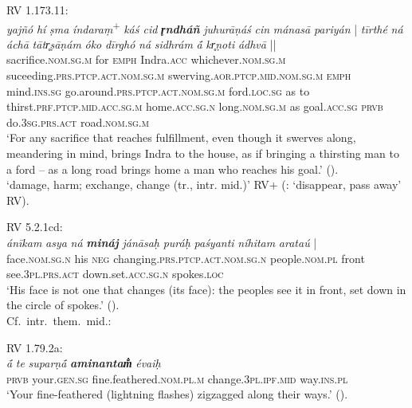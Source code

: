 \documentclass[output=paper,colorlinks,citecolor=brown]{langscibook}
\begin{document}
\begin{exe}
\begin{xlist}
 RV 1.173.11:\\ \gll \textit{yajñó} \textit{hí} \textit{ṣma} \textit{índaraṃ}\textsuperscript{+} \textit{káś cid} {\textbf{\textit{r̥ndháñ}} } \textit{juhurāṇáś} \textit{cin} \textit{mánasā} {\textit{pariyán} |} \textit{tīrthé} \textit{ná} \textit{áchā} \textit{tātr̥ṣāṇám} \textit{óko}  \textit{dīrghó} \textit{ná} \textit{sidhrám} \textit{ā́} \textit{kr̥ṇoti} {\textit{ádhvā} ||}\\
 sacrifice.\textsc{nom.sg.m} for \textsc{emph} Indra.\textsc{acc} whichever.\textsc{nom.sg.m} suceeding.\textsc{prs.ptcp.act.nom.sg.m} swerving.\textsc{aor.ptcp.mid.nom.sg.m} \textsc{emph} mind.\textsc{ins.sg} go.around.\textsc{prs.ptcp.act.nom.sg.m}  ford.\textsc{loc.sg} as to thirst.\textsc{prf.ptcp.mid.acc.sg.m} home.\textsc{acc.sg.n} long.\textsc{nom.sg.m} as goal.\textsc{acc.sg} \textsc{prvb} do.\textsc{3sg.prs.act} road.\textsc{nom.sg.m} \\
\glt   `For any sacrifice that reaches fulfillment, even though it swerves along, meandering in mind, brings Indra to the house, as if bringing a thirsting man to a ford -- as a long road brings home a man who reaches his goal.' (\citealt{JamisonBrereton2014}).\\

\ex  {} ‘damage, harm; exchange, change (tr., intr. mid.)’ RV+ (:  ‘disappear, pass away’ RV).\\
\smallskip

RV 5.2.1cd:\\ \gll \textit{ánīkam} \textit{asya} \textit{ná} {\textbf{\textit{mináj}} } \textit{jánāsaḥ}  \textit{puráḥ} \textit{paśyanti} \textit{níhitam} {\textit{arataú} |}\\
face.\textsc{nom.sg.n} his \textsc{neg} changing.\textsc{prs.ptcp.act.nom.sg.n} people.\textsc{nom.pl} front see.\textsc{3pl.prs.act} down.set.\textsc{acc.sg.n} spokes.\textsc{loc}\\
\glt `His face is not one that changes (its face): the peoples see it in front, set down in the circle of spokes.' (\citealt{JamisonBrereton2014}).\\

\smallskip
Cf.\ intr.\ them.\ mid.:\\\smallskip

RV 1.79.2a:\\ \gll 
\textit{{ā́}} \textit{te} \textit{suparṇ{ā́}} {\textbf{\textit{aminantam̐}} } \textit{évaiḥ}\\
\textsc{prvb} your.\textsc{gen.sg} fine.feathered.\textsc{nom.pl.m} change.\textsc{3pl.ipf.mid} way.\textsc{ins.pl}\\
\glt `Your fine-feathered (lightning flashes) zigzagged along their ways.' (\citealt{JamisonBrereton2014}).\\


\end{xlist}
\end{exe}
\end{document}
